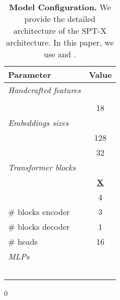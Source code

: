 \begin{table}
\caption{\textbf{Model Configuration.} We provide the detailed architecture of the
SPT-X architecture. In this paper, we use  and .
}
\label{tab:implementation}
\centering
\small{
\begin{tabular}{@{}lc@{}}
    \toprule
    Parameter & Value \\
    \midrule
     {\it Handcrafted features} \\
     &  \\
      & 18 \\
    \midrule
    {\it Embeddings sizes} \\
             & 128 \\
               & 32 \\
    \midrule
    {\it Transformer blocks} \\
               & \underline{\textbf{X}} \\
               & 4 \\
    \# blocks encoder        & 3 \\
    \# blocks decoder        & 1 \\
    \# heads                 & 16 \\
    \midrule
    {\it MLPs} \\
          & \footnotesize   \\
          & \footnotesize  \\
          & \footnotesize  \\
          & \footnotesize  \\
          & \footnotesize  \\

    \bottomrule
\end{tabular}}
\end{table} 
 0
